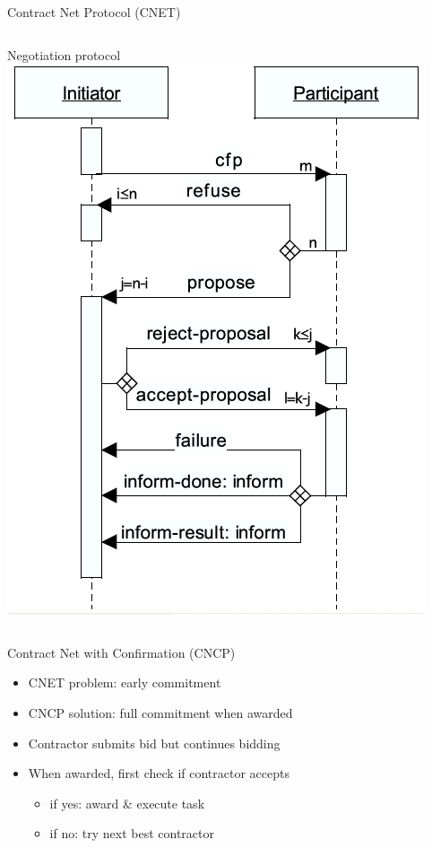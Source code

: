 \documentclass{beamer}
\begin{document}
	\begin{frame}{Contract Net Protocol (CNET)}
	  \begin{columns}[T] %
	   Negotiation protocol
	   \includegraphics[width=\columnwidth]{FIPA-CNET}
	  \end{columns}
	\end{frame}

	\begin{frame}{Contract Net with Confirmation (CNCP)}
		\begin{itemize}
			\item CNET problem: early commitment
			\item CNCP solution: full commitment when awarded
			\item Contractor submits bid but continues bidding
			\item When awarded, first check if contractor accepts
			\begin{itemize}
				\item if yes: award \& execute task
				\item if no: try next best contractor
			\end{itemize}
		\end{itemize}
	\end{frame}
\end{document}

